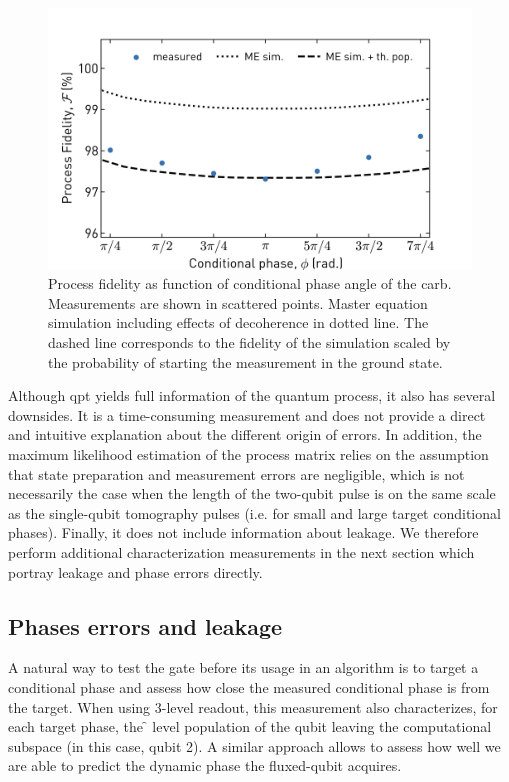 \begin{figure}[ht]
    \centering
    \includegraphics[width=\textwidth]{chapters/carb_gate/figs/ch4_characterization_tomo_all_angles_20200406_144758.png}
    \caption{Process fidelity as function of conditional phase angle of the \gls{carb}. Measurements are shown in scattered points.  Master equation simulation including effects of decoherence in dotted line. The dashed line corresponds to the fidelity of the simulation scaled by the probability of starting the measurement in the ground state. }
    \label{fig:carb_characterization_process_fidelity}
\end{figure}

Although \gls{qpt} yields full information of the quantum process, it also has several downsides. It is a time-consuming measurement and does not provide a direct and intuitive explanation about the different origin of errors. In addition, the maximum likelihood estimation of the process matrix relies on the assumption that state preparation and measurement errors are negligible, which is not necessarily the case when the length of the two-qubit pulse is on the same scale as the single-qubit tomography pulses (i.e. for small and large target conditional phases). Finally, it does not include information about leakage. We therefore perform additional characterization measurements in the next section which portray leakage and phase errors directly.

\subsection{Phases errors and leakage} \label{sec:carb_characterization_phase_errors_leakage}
A natural way to test the gate before its usage in an algorithm is to target a conditional phase and assess how close the measured conditional phase is from the target. When using 3-level readout, this measurement also characterizes, for each target phase, the \f{} level population of the qubit leaving the computational subspace (in this case, qubit 2). A similar approach allows to assess how well we are able to predict the dynamic phase the fluxed-qubit acquires.

